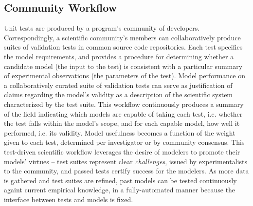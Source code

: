 \documentclass[11pt,letterpaper]{article}
\begin{document}
\subsection{Community Workflow}
Unit tests are produced by a program's community of developers. Correspondingly, a scientific community's members can collaboratively produce suites of validation tests in common source code repositories. Each test specifies the model requirements, and provides a procedure for determining whether a candidate model (the input to the test) is consistent with a particular summary of experimental observations (the parameters of the test). Model performance on a collaboratively curated suite of validation tests can serve as justification of claims regarding the model's validity as a description of the scientific system characterized by the test suite.
This workflow continuously produces a summary of the field indicating which models are capable of taking each test, i.e. whether the test falls within the model's scope, and for each capable model, how well it performed, i.e. its validity.  Model usefulness becomes a function of the weight given to each test, determined per investigator or by community consensus. This test-driven scientific workflow leverages the desire of modelers to promote their models' virtues -- test suites represent clear \emph{challenges}, issued by experimentalists to the community, and passed tests certify success for the modelers. As more data is gathered and test suites are refined, past models can be tested continuously againt current empirical knowledge, in a fully-automated manner because the interface between tests and models is fixed.  
\end{document}

